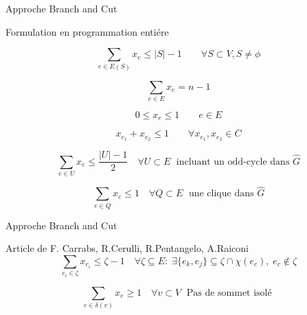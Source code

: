 \begin{frame}{Approche Branch and Cut}
    \begin{block}{Formulation en programmation entiére}
    {\color{blue}  
        \begin{equation}
            \sum_{e \in E(S)} x_{e} \leq |S|-1 \qquad  \forall S \subset V, S \neq \phi 
        \end{equation}    
        
        \begin{equation}
             \sum_{e \in E} x_{e} = n-1
        \end{equation}
        
        \begin{equation}
            0\leq x_{e} \leq 1 \qquad  e \in E  
        \end{equation}
         
        \begin{equation}
            x_{e_{1}} + x_{e_{2}} \leq 1 \qquad  \forall{x_{e_{1}}, x_{e_{2}}} \in C  
        \end{equation}
         
        \begin{equation}
             \sum_{e \in U} x_{e} \leq \frac{|U|-1}{2}  \quad  \forall U \subset E \; \text{ incluant un odd-cycle dans }   \hat{G} 
        \end{equation}
    }
        \begin{equation}
             \sum_{e \in Q} x_{e} \leq 1  \quad  \forall Q \subset E \; \text{ une clique dans }   \hat{G} 
        \end{equation}
        \end{block}
\end{frame}

\begin{frame}{Approche Branch and Cut}
    \begin{block}{Article de F. Carrabs, R.Cerulli, R.Pentangelo, A.Raiconi}
        \begin{equation}
             \sum_{e_{i} \in \zeta}x_{e_{i}} \leq \zeta-1  \quad  \forall \zeta \subseteq E : \; \exists\{e_{k},e_{j}\}\subseteq \zeta \cap \chi(e_{c}), \; e_{c} \not\in \zeta
        \end{equation}
        
        \begin{equation}
             \sum_{e \in \delta(v)} x_{e} \geq 1  \quad  \forall v \subset V \; \text{ Pas de sommet isolé }  
        \end{equation}
    \end{block}
\end{frame}

